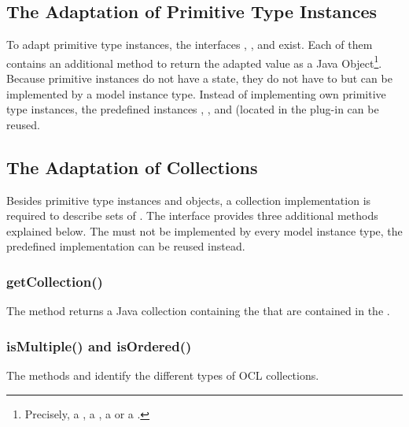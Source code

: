 \subsection{The Adaptation of Primitive Type Instances}

To adapt primitive type instances, the interfaces , ,  and  exist. Each of them contains an additional method to return the adapted value as a Java Object\footnote{Precisely, a , a , a  or a .}. Because primitive instances do not have a state, they do not have to but can be implemented by a model instance type. Instead of implementing own primitive type instances, the predefined instances , ,  and  (located in the plug-in  can be reused.


\subsection{The Adaptation of Collections}

Besides primitive type instances and objects, a collection implementation is required to describe sets of . The interface  provides three additional methods explained below. The  must not be implemented by every model instance type, the predefined implementation  can be reused instead.

\subsubsection{getCollection()}

The method  returns a Java collection containing the  that are contained in the .

\subsubsection{isMultiple() and isOrdered()}

The methods  and  identify the different types of \acs{OCL} collections.


